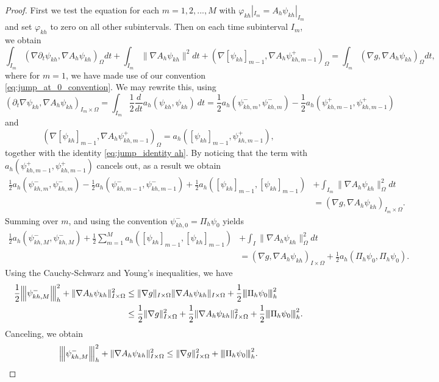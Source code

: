 \documentclass[10pt,a4paper]{amsart}
\newcommand{\IOm}{I\times \Om}
\newcommand{\ImOm}{I_m\times \Om}
\newcommand{\Om}{\Omega}
\newcommand{\na}{\nabla}
\newcommand{\revB}[1]{\textcolor{black}{#1}}
\newcommand{\vertiii}[1]{{\left\vert\kern-0.25ex\left\vert\kern-0.25ex\left\vert #1
    \right\vert\kern-0.25ex\right\vert\kern-0.25ex\right\vert}}
\begin{document}
\begin{proof}
  First we test the equation for each $m=1,2,...,M$ with $\varphi_{kh}|_{I_m} =A_h\psi_{kh}|_{I_m}$ and set 
  $\varphi_{kh}$ to zero on all other subintervals. Then on each time subinterval $I_m$, we obtain
$$
\int_{I_m}(\na \partial_t \psi_{kh},\na A_h\psi_{kh} )_\Omega dt+\int_{I_m}\|\na A_h \psi_{kh}\|^2dt +(\na [\psi_{kh}]_{m-1}, \na A_h \psi_{kh,m-1}^+)_\Om=\int_{I_m}(\na g,\na A_h \psi_{kh})_\Omega dt,
$$
where for $m=1$, we have made use of our convention \eqref{eq:jump_at_0_convention}.
We may rewrite this, using
$$
(\partial_t \na \psi_{kh},\na A_h \psi_{kh})_{\ImOm} =\int_{I_m}\frac{1}{2}\frac{d}{dt}a_h(\psi_{kh},\psi_{kh})\ dt = \frac{1}{2}a_h(\psi_{kh,m}^-,\psi_{kh,m}^-)-\frac{1}{2}a_h(\psi_{kh,m-1}^+,\psi_{kh,m-1}^+)
$$
and
$$
(\na [\psi_{kh}]_{m-1}, \na A_h \psi_{kh,m-1}^+)_\Om=a_h([\psi_{kh}]_{m-1},\psi^+_{kh,m-1}),
$$
together with the identity \eqref{eq:jump_identity ah}.
By noticing that the term with $a_h(\psi_{kh,m-1}^+,\psi_{kh,m-1}^+)$ cancels out, as a result
we obtain
$$
\begin{aligned}
\frac{1}{2}a_h(\psi_{kh,m}^-,\psi_{kh,m}^-)-\frac{1}{2}a_h(\psi_{kh,m-1}^-,\psi_{kh,m-1}^-)+\frac{1}{2}a_h([\psi_{kh}]_{m-1},[\psi_{kh}]_{m-1}) &+\int_{I_m}\|\na A_h \psi_{kh}\|_\Om^2dt\\&=(\na g, \na A_h \psi_{kh})_{\ImOm}.
\end{aligned}
$$
Summing over $m$, and using the convention $\psi_{kh,0}^- = \Pi_h \psi_0$ yields
$$
\begin{aligned}
\frac{1}{2}a_h(\psi_{kh,M}^-,\psi_{kh,M}^-)+\frac{1}{2}\sum_{m=1}^Ma_h([\psi_{kh}]_{m-1},[\psi_{kh}]_{m-1})&+\int_I \|\na A_h \psi_{kh}\|_\Om^2dt\\
&=(\na g,\na A_h\psi_{kh})_{\IOm}+\frac{1}{2}a_h(\Pi_h\psi_0,\Pi_h\psi_0).
\end{aligned}
$$
Using the Cauchy-Schwarz and Young's inequalities, we have
\revB{
$$
\begin{aligned}
\frac{1}{2} \vertiii{\psi_{kh,M}^-}^2_h + \|\na A_h \psi_{kh}\|^2_{\IOm} &\le \|\na g\|_{I\times \Om}\|\na A_h\psi_{kh}\|_{\IOm}+\frac{1}{2}\vertiii{\Pi_h\psi_0}_h^2\\
&\le \frac{1}{2}\|\na g\|_{I\times \Om}^2+\frac{1}{2}\|\na A_h\psi_{kh}\|^2_{\IOm}+\frac{1}{2}\vertiii{\Pi_h\psi_0}_h^2.
\end{aligned}
 $$
}
Canceling, we obtain
\begin{equation}\label{eq: estimates for integral of ah}
\revB{\vertiii{\psi_{kh,M}^-}^2_h}+ \|\na A_h \psi_{kh}\|^2_{\IOm}\le \|\na g\|^2_{I\times \Om}+\vertiii{\Pi_h\psi_0}_h^2.
\end{equation}



\end{proof}
\end{document}
